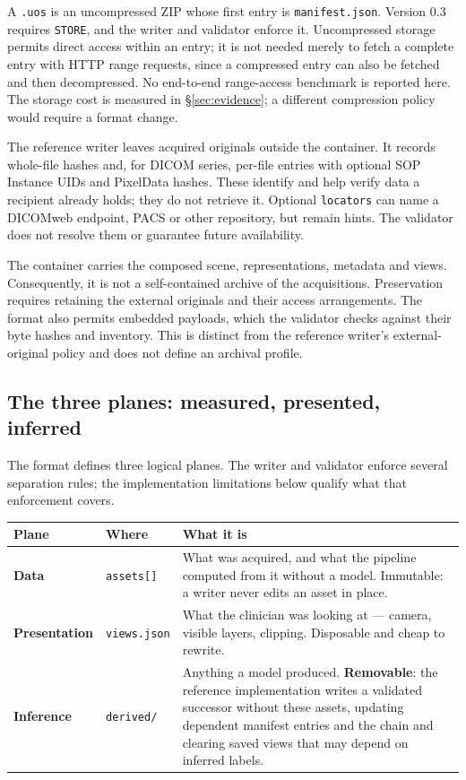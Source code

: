 \documentclass[11pt,a4paper]{article}
\newcommand{\code}[1]{\texttt{\small #1}}
\begin{document}
A \code{.uos} is an uncompressed ZIP whose first entry is \code{manifest.json}.
Version 0.3 requires \code{STORE}, and the writer and validator enforce it. Uncompressed
storage permits direct access within an entry; it is not needed merely to fetch a complete
entry with HTTP range requests, since a compressed entry can also be fetched and then
decompressed. No end-to-end range-access benchmark is reported here. The storage cost is
measured in \S\ref{sec:evidence}; a different compression policy would require a format change.

The reference writer leaves acquired originals outside the container. It records whole-file
hashes and, for DICOM series, per-file entries with optional SOP Instance UIDs and PixelData
hashes. These identify and help verify data a recipient already holds; they do not retrieve
it. Optional \code{locators} can name a DICOMweb endpoint, PACS or other repository, but
remain hints. The validator does not resolve them or guarantee future availability.

The container carries the composed scene, representations, metadata and views. Consequently,
it is not a self-contained archive of the acquisitions. Preservation requires retaining the
external originals and their access arrangements. The format also permits embedded payloads,
which the validator checks against their byte hashes and inventory. This is distinct from
the reference writer's external-original policy and does not define an archival profile.

\subsection{The three planes: measured, presented, inferred}\label{sec:planes}

The format defines three logical planes. The writer and validator enforce several
separation rules; the implementation limitations below qualify what that enforcement covers.

\begin{longtable}{L{2.6cm} L{3.2cm} L{9.4cm}}
\toprule
\textbf{Plane} & \textbf{Where} & \textbf{What it is}\\
\midrule
\endhead
\textbf{Data} & \code{assets[]} & What was acquired, and what the pipeline computed from it
without a model. Immutable: a writer never edits an asset in place.\\
\textbf{Presentation} & \code{views.json} & What the clinician was looking at --- camera,
visible layers, clipping. Disposable and cheap to rewrite.\\
\textbf{Inference} & \code{derived/} & Anything a model produced. \textbf{Removable}: the
reference implementation writes a validated successor without these assets, updating
dependent manifest entries and the chain and clearing saved views that may depend on
inferred labels.\\
\bottomrule
\end{longtable}
\end{document}
